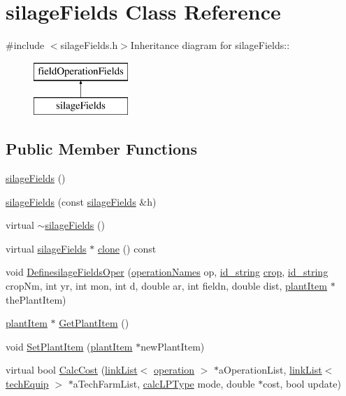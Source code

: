 \hypertarget{classsilage_fields}{
\section{silageFields Class Reference}
\label{classsilage_fields}
}


{\ttfamily \#include $<$silageFields.h$>$}Inheritance diagram for silageFields::\begin{figure}[H]
\begin{center}
\leavevmode
\includegraphics[height=2cm]{classsilage_fields}
\end{center}
\end{figure}
\subsection*{Public Member Functions}
\begin{DoxyCompactItemize}
\item 
\hyperlink{classsilage_fields_ab882102171c0ffffc6a96677c726f906}{silageFields} ()
\item 
\hyperlink{classsilage_fields_a20ef91f1391296a1bd9440e13c7b3c94}{silageFields} (const \hyperlink{classsilage_fields}{silageFields} \&h)
\item 
virtual \hyperlink{classsilage_fields_aa84e406a91dbfd1b553cec61b399085d}{$\sim$silageFields} ()
\item 
virtual \hyperlink{classsilage_fields}{silageFields} $\ast$ \hyperlink{classsilage_fields_a143ee0ad2ae333fe8f9b8b6c119bf46d}{clone} () const 
\item 
void \hyperlink{classsilage_fields_a51348396a66041b5d841d27fadac970e}{DefinesilageFieldsOper} (\hyperlink{operation_names_8h_a77d40de6faa131199a5de6df3d9c7e3d}{operationNames} op, \hyperlink{classfield_operation_fields_a65517d20c09329343461131d07d48ecb}{id\_\-string} \hyperlink{classcrop}{crop}, \hyperlink{classfield_operation_fields_a65517d20c09329343461131d07d48ecb}{id\_\-string} cropNm, int yr, int mon, int d, double ar, int fieldn, double dist, \hyperlink{classplant_item}{plantItem} $\ast$thePlantItem)
\item 
\hyperlink{classplant_item}{plantItem} $\ast$ \hyperlink{classsilage_fields_abf8908c6ba3f05c32dcfee9e7ff07c8a}{GetPlantItem} ()
\item 
void \hyperlink{classsilage_fields_abdc01c52adbfc4947b8bc13550d55a1e}{SetPlantItem} (\hyperlink{classplant_item}{plantItem} $\ast$newPlantItem)
\item 
virtual bool \hyperlink{classsilage_fields_a5ae420a0878bc7f89c3a6fe03f585163}{CalcCost} (\hyperlink{classlink_list}{linkList}$<$ \hyperlink{classoperation}{operation} $>$ $\ast$aOperationList, \hyperlink{classlink_list}{linkList}$<$ \hyperlink{classtech_equip}{techEquip} $>$ $\ast$aTechFarmList, \hyperlink{typer_8h_af05cf854fc14086a0d6404be5ae9813f}{calcLPType} mode, double $\ast$cost, bool update)
\end{DoxyCompactItemize}


